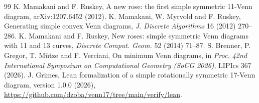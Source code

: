 \documentclass[11pt]{article}
\begin{document}
\begin{thebibliography}{99}
 K. Mamakani and F. Ruskey, A new rose: the first simple symmetric 11-Venn diagram, arXiv:1207.6452 (2012).
 K. Mamakani, W. Myrvold and F. Ruskey, Generating simple convex Venn diagrams, \emph{J. Discrete Algorithms} 16 (2012) 270--286.
 K. Mamakani and F. Ruskey, New roses: simple symmetric Venn diagrams with 11 and 13 curves, \emph{Discrete Comput. Geom.} 52 (2014) 71--87.
 S. Brenner, P. Gregor, T. M\"utze and F. Verciani, On minimum Venn diagrams, in \emph{Proc. 42nd International Symposium on Computational Geometry (SoCG 2026)}, LIPIcs 367 (2026).
 J. Grimes, Lean formalization of a simple rotationally symmetric 17-Venn diagram, version 1.0.0 (2026), \url{https://github.com/dzoba/venn17/tree/main/verify/lean}.
\end{thebibliography}
\end{document}
